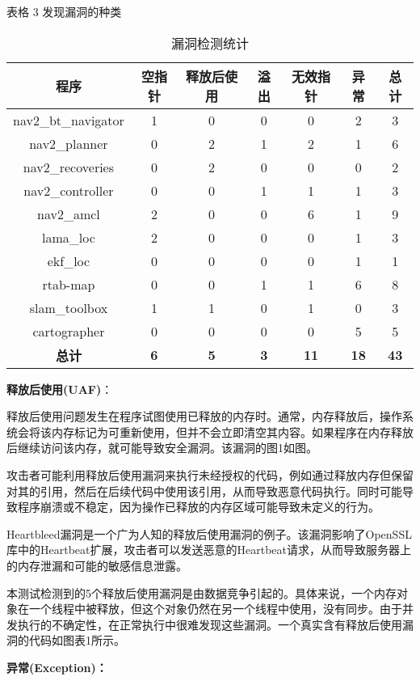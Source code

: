 表格 3 发现漏洞的种类

\begin{table}[H]
\small
\caption{漏洞检测统计}
\centering
\begin{tabular}{ccccccc}
\hline
\textbf{程序} & \textbf{空指针} & \textbf{释放后使用} & \textbf{溢出} & \textbf{无效指针} & \textbf{异常} & \textbf{总计} \\
\hline
nav2\_bt\_navigator & 1 & 0 & 0 & 0 & 2 & 3 \\
nav2\_planner & 0 & 2 & 1 & 2 & 1 & 6 \\
nav2\_recoveries & 0 & 2 & 0 & 0 & 0 & 2 \\
nav2\_controller & 0 & 0 & 1 & 1 & 1 & 3 \\
nav2\_amcl & 2 & 0 & 0 & 6 & 1 & 9 \\
lama\_loc & 2 & 0 & 0 & 0 & 1 & 3 \\
ekf\_loc & 0 & 0 & 0 & 0 & 1 & 1 \\
rtab-map & 0 & 0 & 1 & 1 & 6 & 8 \\
slam\_toolbox & 1 & 1 & 0 & 1 & 0 & 3 \\
cartographer & 0 & 0 & 0 & 0 & 5 & 5 \\
\textbf{总计} & \textbf{6} & \textbf{5} & \textbf{3} & \textbf{11} & \textbf{18} & \textbf{43} \\
\hline
\end{tabular}
\end{table}


\textbf{释放后使用(UAF)}：

释放后使用问题发生在程序试图使用已释放的内存时。通常，内存释放后，操作系统会将该内存标记为可重新使用，但并不会立即清空其内容。如果程序在内存释放后继续访问该内存，就可能导致安全漏洞。该漏洞的图1如图。

攻击者可能利用释放后使用漏洞来执行未经授权的代码，例如通过释放内存但保留对其的引用，然后在后续代码中使用该引用，从而导致恶意代码执行。同时可能导致程序崩溃或不稳定，因为操作已释放的内存区域可能导致未定义的行为。

Heartbleed漏洞是一个广为人知的释放后使用漏洞的例子。该漏洞影响了OpenSSL库中的Heartbeat扩展，攻击者可以发送恶意的Heartbeat请求，从而导致服务器上的内存泄漏和可能的敏感信息泄露。

本测试检测到的5个释放后使用漏洞是由数据竞争引起的。具体来说，一个内存对象在一个线程中被释放，但这个对象仍然在另一个线程中使用，没有同步。由于并发执行的不确定性，在正常执行中很难发现这些漏洞。一个真实含有释放后使用漏洞的代码如图表1所示。


\textbf{异常(Exception)：}

